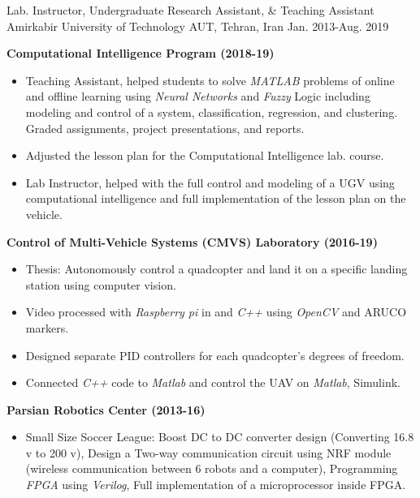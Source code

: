 \begin{cventries}

\cventry
{Lab. Instructor, Undergraduate Research Assistant, \& Teaching Assistant}
{Amirkabir University of Technology}
{AUT, Tehran, Iran}
{Jan. 2013-Aug. 2019}
{
    \begin{cvitems}
    \item{\textbf{Computational Intelligence Program (2018-19)}}
      \begin{itemize}[label= - ] %
        \item{Teaching Assistant, helped students to solve \textit{MATLAB} problems of online and offline learning using \textit{Neural Networks} and \textit{Fuzzy} Logic including modeling and control of a system, classification, regression, and clustering. Graded assignments, project presentations, and reports.}
        \item{Adjusted the lesson plan for the Computational Intelligence lab. course.}
        \item{Lab Instructor, helped with the full control and modeling of a UGV using computational intelligence and full implementation of the lesson plan on the vehicle.}
      \end{itemize}
      \item{\textbf{Control of Multi-Vehicle Systems (CMVS) Laboratory (2016-19)}}
      \begin{itemize}[label= - ] %
        \item{Thesis: Autonomously control a quadcopter and land it on a specific landing station using computer vision.}
          \item{Video processed with \textit{Raspberry pi} in  and \textit{C++ } using \textit{OpenCV} and ARUCO markers.}
          \item{Designed separate PID controllers for each quadcopter's degrees of freedom.}
          \item{Connected \textit{C++} code to \textit{Matlab} and control the UAV  on \textit{Matlab}, Simulink.}
      \end{itemize}
      \item{\textbf{Parsian Robotics Center (2013-16)}}
      \begin{itemize}[label= - ] %
        \item {Small Size Soccer League: Boost DC to DC converter design (Converting 16.8 v to 200 v),	Design a Two-way communication circuit using NRF module (wireless communication between 6 robots and a computer), Programming \textit{FPGA} using \textit{Verilog}, Full implementation of a microprocessor inside FPGA.}

\end{itemize}
\end{cvitems}}
\end{cventries}
